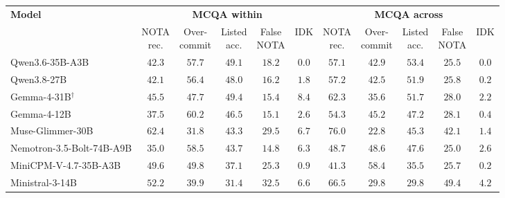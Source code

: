 \setlength{\tabcolsep}{4pt}
\begin{tabular}{lcccccccccc}
\toprule
\multirow{2}{*}{\textbf{Model}} & \multicolumn{5}{c}{\textbf{MCQA within}} & \multicolumn{5}{c}{\textbf{MCQA across}} \\
\cmidrule(lr){2-6} \cmidrule(lr){7-11}
 & \makecell{NOTA\\rec.} & \makecell{Over-\\commit} & \makecell{Listed\\acc.} & \makecell{False\\NOTA} & IDK & \makecell{NOTA\\rec.} & \makecell{Over-\\commit} & \makecell{Listed\\acc.} & \makecell{False\\NOTA} & IDK \\
\midrule
Qwen3.6-35B-A3B & $42.3$ & $57.7$ & $49.1$ & $18.2$ & $0.0$ & $57.1$ & $42.9$ & $53.4$ & $25.5$ & $0.0$ \\
Qwen3.8-27B & $42.1$ & $56.4$ & $48.0$ & $16.2$ & $1.8$ & $57.2$ & $42.5$ & $51.9$ & $25.8$ & $0.2$ \\
Gemma-4-31B$^\dagger$ & $45.5$ & $47.7$ & $49.4$ & $15.4$ & $8.4$ & $62.3$ & $35.6$ & $51.7$ & $28.0$ & $2.2$ \\
Gemma-4-12B & $37.5$ & $60.2$ & $46.5$ & $15.1$ & $2.6$ & $54.3$ & $45.2$ & $47.2$ & $28.1$ & $0.4$ \\
Muse-Glimmer-30B & $62.4$ & $31.8$ & $43.3$ & $29.5$ & $6.7$ & $76.0$ & $22.8$ & $45.3$ & $42.1$ & $1.4$ \\
Nemotron-3.5-Bolt-74B-A9B & $35.0$ & $58.5$ & $43.7$ & $14.8$ & $6.3$ & $48.7$ & $48.6$ & $47.6$ & $25.0$ & $2.6$ \\
MiniCPM-V-4.7-35B-A3B & $49.6$ & $49.8$ & $37.1$ & $25.3$ & $0.9$ & $41.3$ & $58.4$ & $35.5$ & $25.7$ & $0.2$ \\
Ministral-3-14B & $52.2$ & $39.9$ & $31.4$ & $32.5$ & $6.6$ & $66.5$ & $29.8$ & $29.8$ & $49.4$ & $4.2$ \\
\bottomrule
\end{tabular}
